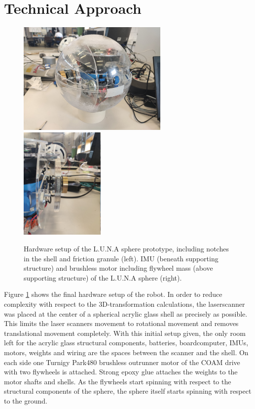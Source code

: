 \section{Technical Approach}
\label{sec:TechnicalApproach}

\begin{figure}
\centering
\includegraphics[height=55mm]{../Media/sphereFullshellLeft.jpg}
\hfill
\includegraphics[height=55mm]{../Media/sphereRightMotor.jpg}   
\caption{Hardware setup of the L.U.N.A sphere prototype, including notches in the shell and friction granule (left). IMU (beneath supporting structure) and brushless motor  including flywheel mass (above supporting structure) of the L.U.N.A sphere (right).}
\label{sec:TechnicalApproach:fig:setup}
\end{figure}


Figure \ref{sec:TechnicalApproach:fig:setup} shows the final hardware setup of the robot.
In order to reduce complexity with respect to the 3D-transformation calculations, the laserscanner was placed at the center of a spherical acrylic glass shell as precisely as possible.
This limits the laser scanners movement to rotational movement and removes translational movement completely. With this initial setup given, the only room left for the acrylic glass structural components, batteries, boardcomputer, IMUs, motors, weights and wiring are the spaces between the scanner and the shell. On each side one Turnigy Park480 brushless outrunner motor \cite{turnigymotor} of the COAM drive with two flywheels is attached.
Strong epoxy glue attaches the weights to the motor shafts and shells.
As the flywheels start spinning with respect to the structural components of the sphere, the sphere itself starts spinning with respect to the ground. 

